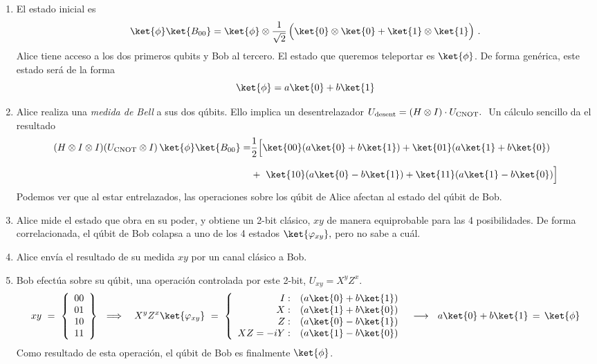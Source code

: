 \documentclass[a4paper,11pt]{book} %
\numberwithin{equation}{chapter}
\def\Lc{\Bigl[}
\def\Rc{\Bigr]}
\def\L.{\Bigl.}
\def\R.{\Bigr.}
\begin{document}
\begin{enumerate}
	\item El estado inicial es
$$ 
\ket{\phi} \ket{B_{00}} =  \ket{\phi}\otimes \frac{1}{\sqrt{2}}\left(\ket{0}\otimes \ket{0} + \ket{1}\otimes\ket{1}\rule{0mm}{4mm}\right)\, .
$$
Alice tiene acceso a los dos primeros qubits y Bob al tercero. El estado que queremos teleportar es $\ket{\phi}$. De forma genérica, este estado será de la forma
$$
\ket{\phi} = a \ket{0} + b \ket{1}
$$

	\item Alice realiza una  \textit{medida de Bell} a sus dos qúbits.
Ello  implica un desentrelazador $U_{\rm desent}= (H \otimes I)\cdot U_{\rm CNOT}.~$
Un cálculo sencillo  da el resultado
	\begin{align*} 
	(H \otimes I\otimes I)(U_{\rm CNOT}\otimes I)\, \ket{\phi}\ket{B_{00}}  = &  \frac{1}{2}
	\Lc \rule{0mm}{3mm} \ket{00}(a\ket{0} + b\ket{1}) + \ket{01}(a\ket{1}+ b\ket{0}) \R. \\
	\rule{0mm}{6mm}
	&\L.  \rule{0mm}{3mm}+ ~\ket{10}(a\ket{0}-b\ket{1}) + \ket{11}(a\ket{1}-b\ket{0}) \Rc
	\end{align*}
	Podemos ver que al estar entrelazados, las operaciones sobre los qúbit de Alice afectan al estado del qúbit de Bob. 

	\item Alice mide el estado que obra en su poder, y obtiene un 2-bit  clásico, $xy$ de manera equiprobable para las 4 posibilidades. De forma correlacionada, el qúbit de Bob colapsa a uno de los 4 estados $\ket{\varphi_{xy}},$ pero no sabe a cuál. 

	\item Alice envía el resultado de su medida $xy$ por un canal clásico a Bob.
	
	\item Bob efectúa sobre su qúbit, una operación controlada por este 2-bit, $U_{xy} =  X^y Z^x $. 
$$
xy ~=~ \left\{ \begin{array}{c} 00 \\ 01 \\ 10 \\ 11 \end{array} \right\}~~ \Longrightarrow  
~~~ X^y Z^x \ket{\varphi_{xy}} ~=~ \left\{  \begin{array}{rl}    I :& (a\ket{0} + b\ket{1})  \\    X: & (a\ket{1} + b\ket{0})  \\  Z:& (a\ket{0} - b\ket{1})  
\\  XZ = -iY:&   (a\ket{1} - b\ket{0}) \\
       \end{array} \right. ~~ \longrightarrow  ~~ a \ket{0} + b\ket{1}\,  = \, \ket{\phi}
$$
Como resultado de esta operación, el qúbit de Bob es finalmente $\ket{\phi}$.

\end{enumerate}
\end{document}
